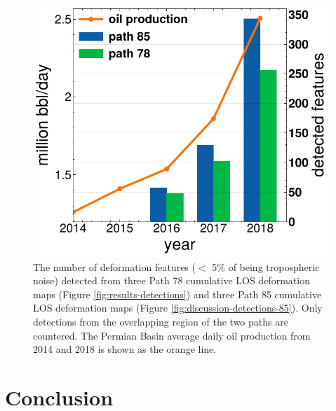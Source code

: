\documentclass{utexasthesis}
\begin{document}
\begin{figure}[hbt!]
	\centering 
	\includegraphics[width=0.98\linewidth]{paper2/figures/figure_discussion_oil_vs_blob_count.pdf}
	\caption[Number of detected deformation figures and yearly oil production]{
		The number of deformation features ($<$ 5\% of being tropospheric noise) detected from three Path 78 cumulative LOS deformation maps (Figure \ref{fig:results-detections}) and three Path 85 cumulative LOS deformation maps (Figure \ref{fig:discussion-detections-85}). Only detections from the overlapping region of the two paths are countered. The Permian Basin average daily oil production from 2014 and 2018 is shown as the orange line.
	}
	\label{fig:discussion-oil-blob-count}
\end{figure}



\section{Conclusion}
\end{document}
